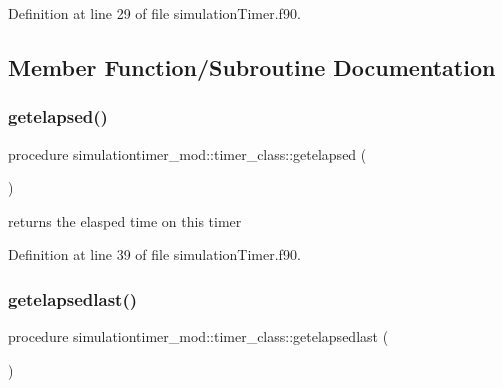 Definition at line 29 of file simulation\+Timer.\+f90.



\subsection{Member Function/\+Subroutine Documentation}
\mbox{\label{structsimulationtimer__mod_1_1timer__class_a8d93e7223e1bbd78bc38c72e88fd2e41}} 
\subsubsection{\texorpdfstring{getelapsed()}{getelapsed()}}
{\footnotesize\ttfamily procedure simulationtimer\+\_\+mod\+::timer\+\_\+class\+::getelapsed (\begin{DoxyParamCaption}{ }\end{DoxyParamCaption})\hspace{0.3cm}{\ttfamily [private]}}



returns the elasped time on this timer 



Definition at line 39 of file simulation\+Timer.\+f90.

\mbox{\label{structsimulationtimer__mod_1_1timer__class_afdc04887277d28174b69cfa00ede5f38}} 
\subsubsection{\texorpdfstring{getelapsedlast()}{getelapsedlast()}}
{\footnotesize\ttfamily procedure simulationtimer\+\_\+mod\+::timer\+\_\+class\+::getelapsedlast (\begin{DoxyParamCaption}{ }\end{DoxyParamCaption})\hspace{0.3cm}{\ttfamily [private]}}



